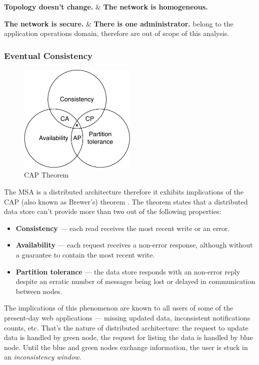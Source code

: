 \documentclass[thesis=M,english,hidelinks]{FITthesis}[2012/10/20]
\begin{document}
\textbf{Topology doesn't change.} \& \textbf{The network is homogeneous.} 

\textbf{The network is secure.} \& \textbf{There is one administrator.} belong to the application operations domain, therefore are out of scope of this analysis.

\subsubsection{Eventual Consistency}
\begin{figure}
  \centering
    \includegraphics[width=0.5\textwidth]{images/CAP.pdf}
    \caption{CAP Theorem}
    \label{fig:cap}
\end{figure}
The \acrshort{MSA} is a distributed architecture therefore it exhibits implications of the \acrshort{CAP} (also known as Brewer's) theorem \cite{cap-acm}. The theorem states that a distributed data store can't provide more than two out of the following properties:
\begin{itemize}
    \item \textbf{Consistency} --- each read receives the most recent write or an error.
    \item \textbf{Availability} --- each request receives a non-error response, although without a guarantee to contain the most recent write.
    \item \textbf{Partition tolerance} --- the data store responds with an non-error reply despite an erratic number of messages being lost or delayed in communication between nodes.
\end{itemize}

The implications of this phenomenon are known to all users of some of the present-day web applications --- missing updated data, inconsistent notifications counts, etc. That's the nature of distributed architecture: the request to update data is handled by green node, the request for listing the data is handled by blue node. Until the blue and green nodes exchange information, the user is stuck in an \textit{inconsistency window}.
\end{document}
